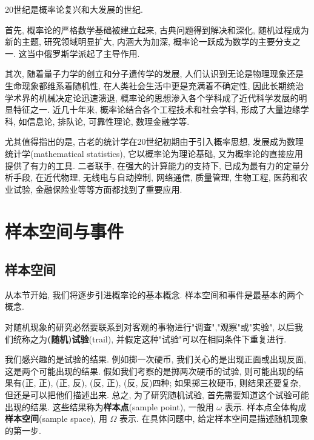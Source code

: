 \documentclass[../../main.tex]{subfiles}
\begin{document}
20世纪是概率论复兴和大发展的世纪. 

首先, 概率论的严格数学基础被建立起来, 古典问题得到解决和深化, 随机过程成为新的主题, 研究领域明显扩大, 内涵大为加深, 概率论一跃成为数学的主要分支之一. 这当中俄罗斯学派起了主导作用. 

其次, 随着量子力学的创立和分子遗传学的发展, 人们认识到无论是物理现象还是生命现象都维系着随机性, 在人类社会生活中更是充满着不确定性, 因此长期统治学术界的机械决定论迅速溃退, 概率论的思想渗入各个学科成了近代科学发展的明显特征之一. 近几十年来, 概率论结合各个工程技术和社会学科, 形成了大量边缘学科, 如信息论, 排队论, 可靠性理论, 数理金融学等. 

尤其值得指出的是, 古老的统计学在20世纪初期由于引入概率思想, 发展成为数理统计学(mathematical statistics), 它以概率论为理论基础, 又为概率论的直接应用提供了有力的工具. 二者联手, 在强大的计算能力的支持下, 已成为最有力的定量分析手段, 在近代物理, 无线电与自动控制, 网络通信, 质量管理, 生物工程, 医药和农业试验, 金融保险业等等方面都找到了重要应用. 

\section{样本空间与事件}

\subsection{样本空间}

从本节开始, 我们将逐步引进概率论的基本概念. 样本空间和事件是最基本的两个概念. 

对随机现象的研究必然要联系到对客观的事物进行"调查","观察"或"实验", 以后我们统称之为\textbf{(随机)试验}(trail), 并假定这种"试验"可以在相同条件下重复进行. 

我们感兴趣的是试验的结果. 例如掷一次硬币, 我们关心的是出现正面或出现反面, 这是两个可能出现的结果. 假如我们考察的是掷两次硬币的试验, 则可能出现的结果有(正, 正), (正, 反), (反, 正), (反, 反)四种; 如果掷三枚硬币, 则结果还要复杂, 但还是可以把他们描述出来. 总之, 为了研究随机试验, 首先需要知道这个试验可能出现的结果. 这些结果称为\textbf{样本点}(sample point), 一般用 $\omega$ 表示. 样本点全体构成\textbf{样本空间}(sample space), 用 $\Omega$ 表示. 在具体问题中, 给定样本空间是描述随机现象的第一步. 
\end{document}
